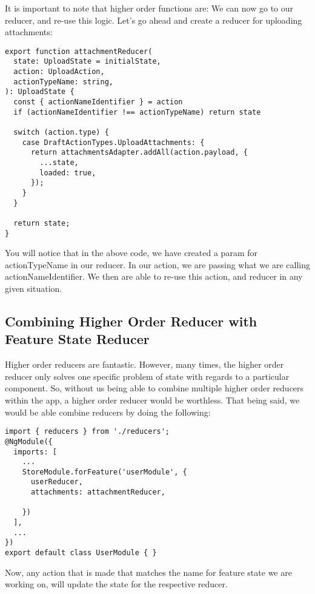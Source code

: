 It is important to note that higher order functions are:
We can now go to our reducer, and re-use this logic. Let's
go ahead and create a reducer for uploading attachments:

\begin{lstlisting}
export function attachmentReducer(
  state: UploadState = initialState,
  action: UploadAction,
  actionTypeName: string,
): UploadState {
  const { actionNameIdentifier } = action
  if (actionNameIdentifier !== actionTypeName) return state

  switch (action.type) {
    case DraftActionTypes.UploadAttachments: {
      return attachmentsAdapter.addAll(action.payload, {
        ...state,
        loaded: true,
      });
    }
  }

  return state;
}
\end{lstlisting}

You will notice that in the above code, we have created a param for
actionTypeName in our reducer. In our action, we are passing what we are calling
actionNameIdentifier. We then are able to re-use this action, and reducer in any
given situation.

\subsection{Combining Higher Order Reducer with Feature State Reducer }

Higher order reducers are fantastic. However, many times, the higher order
reducer only solves one specific problem of state with regards to a particular
component. So, without us being able to combine multiple higher order reducers
within the app, a higher order reducer would be worthless. That being said, we
would be able combine reducers by doing the following:

\begin{lstlisting}
import { reducers } from './reducers';
@NgModule({
  imports: [
    ...
    StoreModule.forFeature('userModule', {
      userReducer,
      attachments: attachmentReducer,

    })
  ],
  ...
})
export default class UserModule { }
\end{lstlisting}

Now, any action that is made that matches the name for feature state we are
working on, will update the state for the respective reducer.

